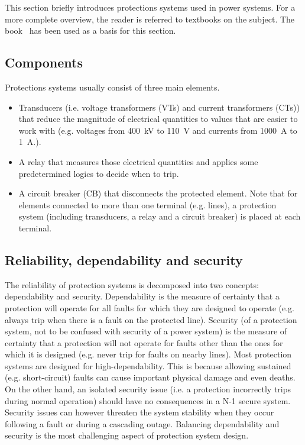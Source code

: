 This section briefly introduces protections systems used in power systems. For a more complete overview, the reader is referred to textbooks on the subject. The book~\cite{HorowitzBook} has been used as a basis for this section.

\subsection{Components}

Protections systems usually consist of three main elements. 

\begin{itemize}
    \item Transducers (i.e. voltage transformers (VTs) and current transformers (CTs)) that reduce the magnitude of electrical quantities to values that are easier to work with (e.g. voltages from 400~kV to 110~V and currents from 1000~A to 1~A.).
    \item A relay that measures those electrical quantities and applies some predetermined logics to decide when to trip.
    \item A circuit breaker (CB) that disconnects the protected element. Note that for elements connected to more than one terminal (e.g. lines), a protection system (including transducers, a relay and a circuit breaker) is placed at each terminal.
\end{itemize}

\subsection{Reliability, dependability and security}

The reliability of protection systems is decomposed into two concepts: dependability and security. Dependability is the measure of certainty that a protection will operate for all faults for which they are designed to operate (e.g. always trip when there is a fault on the protected line). Security (of a protection system, not to be confused with security of a power system) is the measure of certainty that a protection will not operate for faults other than the ones for which it is designed (e.g. never trip for faults on nearby lines). Most protection systems are designed for high-dependability. This is because allowing sustained (e.g. short-circuit) faults can cause important physical damage and even deaths. On the other hand, an isolated security issue (i.e. a protection incorrectly trips during normal operation) should have no consequences in a N-1 secure system. Security issues can however threaten the system stability when they occur following a fault or during a cascading outage. Balancing dependability and security is the most challenging aspect of protection system design.

